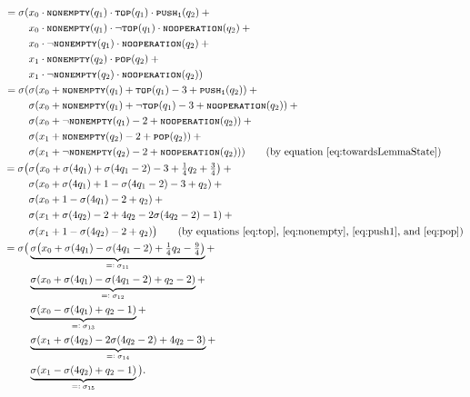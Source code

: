 \documentclass{book}
\newcommand{\eqdef}{=\vcentcolon}
\newcommand{\pushone}{\texttt{\textsc{push}}\textsubscript{\texttt{1}}}
\newcommand{\nonempty}{\textsc{\texttt{nonempty}}}
\newcommand{\tos}{\textsc{\texttt{top}}}
\newcommand{\pop}{\textsc{\texttt{pop}}}
\newcommand{\noop}{\textsc{\texttt{nooperation}}}
\theoremstyle{definition}
\theoremstyle{plain}
\theoremstyle{plain}
\theoremstyle{remark}
\theoremstyle{plain}
\begin{document}
\begin{align*}
			 =\sigma(&x_0\cdot\nonempty(q_1)\cdot\tos(q_1)\cdot\pushone(q_2)\:+ \\
					 &x_0\cdot\nonempty(q_1)\cdot\lnot\tos(q_1)\cdot\noop(q_2)\:+ \\
					 &x_0\cdot\lnot\nonempty(q_1)\cdot\noop(q_2)\:+ \\
					 &x_1\cdot\nonempty(q_2)\cdot\pop(q_2)\:+ \\
					 &x_1\cdot\lnot\nonempty(q_2)\cdot\noop(q_2)) \\
			 =\sigma(&\sigma(x_0+\nonempty(q_1)+\tos(q_1)-3+\pushone(q_2))\:+ \\
					 &\sigma(x_0+\nonempty(q_1)+\lnot\tos(q_1)-3+\noop(q_2))\:+ \\
					 &\sigma(x_0+\lnot\nonempty(q_1)-2+\noop(q_2))\:+ \\
					 &\sigma(x_1+\nonempty(q_2)-2+\pop(q_2))\:+ \\
					 &\sigma(x_1+\lnot\nonempty(q_2)-2+\noop(q_2))) \tag{by equation \ref{eq:towardsLemmaState}} \\
			 =\sigma\big(&\sigma\big(x_0+\sigma(4q_1)+\sigma(4q_1-2)-3+\textstyle{\frac{1}{4}}q_2+\textstyle{\frac{3}{4}}\big)\:+ \\
					 &\sigma(x_0+\sigma(4q_1)+1-\sigma(4q_1-2)-3+q_2)\:+ \\
					 &\sigma(x_0+1-\sigma(4q_1)-2+q_2)\:+ \\
					 &\sigma(x_1+\sigma(4q_2)-2+4q_2-2\sigma(4q_2-2)-1)\:+ \\
					 &\sigma(x_1+1-\sigma(4q_2)-2+q_2)\big) \tag{by equations \ref{eq:top}, \ref{eq:nonempty}, \ref{eq:push1}, and \ref{eq:pop}} \\
			 =\sigma\big(&\underbrace{\sigma\big(x_0+\sigma(4q_1)-\sigma(4q_1-2)+\textstyle{\frac{1}{4}}q_2-\textstyle{\frac{9}{4}}\big)}_\text{$\eqdef\sigma_{11}$}+ \\
					 &\underbrace{\sigma(x_0+\sigma(4q_1)-\sigma(4q_1-2)+q_2-2)}_\text{$\eqdef\sigma_{12}$}+ \\
					 &\underbrace{\sigma(x_0-\sigma(4q_1)+q_2-1)}_\text{$\eqdef\sigma_{13}$}+ \\
					 &\underbrace{\sigma(x_1+\sigma(4q_2)-2\sigma(4q_2-2)+4q_2-3)}_\text{$\eqdef\sigma_{14}$}+ \\
					 &\underbrace{\sigma(x_1-\sigma(4q_2)+q_2-1)}_\text{$\eqdef\sigma_{15}$}\big).
	\end{align*}
	\endgroup
	
\end{document}
